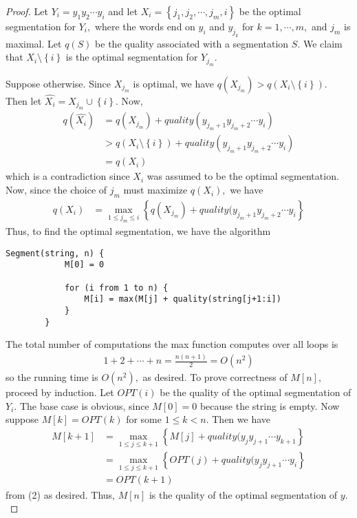 \documentclass{article}
\begin{document}
\begin{proof}
	Let $Y_i=y_1y_2\cdots y_i$ and let $X_i=\left\{ j_1, j_2, \cdots, j_m, i \right\}$ be the optimal segmentation for $Y_i,$ where the words end on $y_i$ and $y_{j_k}$ for $k=1, \cdots, m,$ and $j_m$ is maximal. Let $q(S)$ be the quality associated with a segmentation $S.$ We claim that $X_i\setminus\left\{i\right\}$ is the optimal segmentation for $Y_{j_m}.$

	Suppose otherwise. Since $X_{j_m}$ is optimal, we have $q(X_{j_m})>q(X_i\setminus\left\{ i \right\}).$ Then let $\hat{X_i}=X_{j_m}\cup \left\{ i \right\}.$ Now,
	\begin{align*}
		q(\hat{X_i}) &= q(X_{j_m}) + quality(y_{j_m+1}y_{j_m+2}\cdots y_i) \\
		&> q(X_i\setminus\left\{ i \right\}) + quality(y_{j_m+1}y_{j_m+2}\cdots y_i) \\
		&= q(X_i)
	\end{align*}
	which is a contradiction since $X_i$ was assumed to be the optimal segmentation. Now, since the choice of $j_m$ must maximize $q(X_i),$ we have
	\begin{align*}
		q(X_i) &= \max_{1\le j_m\le i} \left\{ q(X_{j_m}) + quality(y_{j_m+1}y_{j_m+2}\cdots y_i \right\} \tag{2}
	\end{align*}
	Thus, to find the optimal segmentation, we have the algorithm
	\begin{Verbatim}[tabsize=4]
		Segment(string, n) {
			M[0] = 0

			for (i from 1 to n) {
				M[i] = max(M[j] + quality(string[j+1:i])
			}
		}
	\end{Verbatim}

	The total number of computations the max function computes over all loops is 
	\begin{align*}
		1+2+\cdots+n=\frac{n(n+1)}{2} = O(n^2)
	\end{align*}
	so the running time is $O(n^2),$ as desired. To prove correctness of $M[n],$ proceed by induction. Let $OPT(i)$ be the quality of the optimal segmentation of $Y_i.$ The base case is obvious, since $M[0]=0$ because the string is empty. Now suppose $M[k]=OPT(k)$ for some $1\le k<n.$ Then we have
	\begin{align*}
		M[k+1] &= \max_{1\le j\le k+1} \left\{ M[j] + quality(y_jy_{j+1}\cdots y_{k+1} \right\} \\
		&= \max_{1\le j\le k+1}\left\{ OPT(j)+quality(y_jy_{j+1}\cdots y_i \right\} \\
		&= OPT(k+1)
	\end{align*}
	from (2) as desired. Thus, $M[n]$ is the quality of the optimal segmentation of $y.$
\end{proof}
\end{document}
